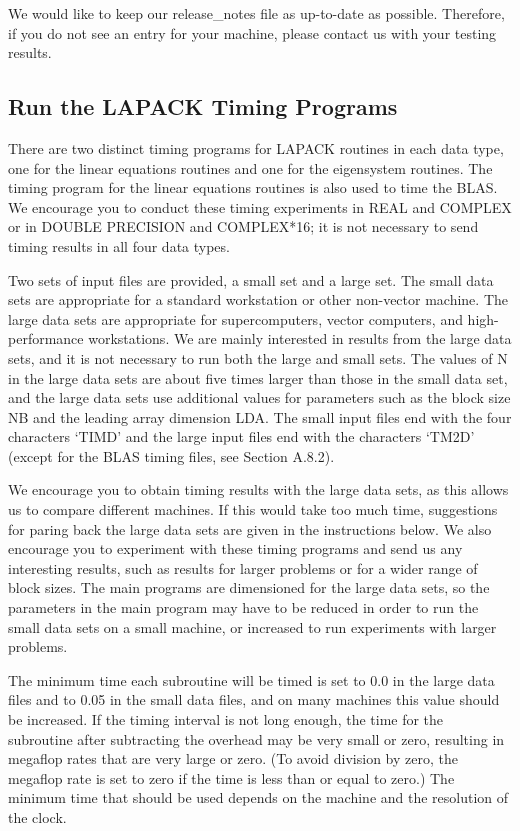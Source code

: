 We would like to keep our release\_notes file as up-to-date as possible.
Therefore, if you do not see an entry for your machine, please contact us
with your testing results.

\subsection{Run the LAPACK Timing Programs}

\dent
There are two distinct timing programs for LAPACK routines
in each data type, one for the linear equations routines and
one for the eigensystem routines.  The timing program for the
linear equations routines is also used to time the BLAS.
We encourage you to conduct these timing experiments
in REAL and COMPLEX or in DOUBLE PRECISION and COMPLEX*16; it is
not necessary to send timing results in all four data types.

Two sets of input files are provided, a small set and a large set.
The small data sets are appropriate for a standard workstation or
other non-vector machine.
The large data sets are appropriate for supercomputers, vector
computers, and high-performance workstations.
We are mainly interested in results from the large data sets, and
it is not necessary to run both the large and small sets.
The values of N in the large data sets are about five times larger
than those in the small data set,
and the large data sets use additional values for parameters such as the
block size NB and the leading array dimension LDA.
The small input files end with the four characters `TIMD' and the
large input files end with the characters `TM2D' (except for the
BLAS timing files, see Section A.8.2).

We encourage you to obtain timing results with the large data sets,
as this allows us to compare different machines.
If this would take too much time, suggestions for paring back the large
data sets are given in the instructions below.
We also encourage you to experiment with these timing
programs and send us any interesting results, such as results for
larger problems or for a wider range of block sizes.
The main programs are dimensioned for the large data sets,
so the parameters in the main program may have to be reduced in order
to run the small data sets on a small machine, or increased to run
experiments with larger problems.

The minimum time each subroutine will be timed is set to 0.0 in
the large data files and to 0.05 in the small data files, and on
many machines this value should be increased.
If the timing interval is not long
enough, the time for the subroutine after subtracting the overhead
may be very small or zero, resulting in megaflop rates that are
very large or zero. (To avoid division by zero, the megaflop rate is
set to zero if the time is less than or equal to zero.)
The minimum time that should be used depends on the machine and the
resolution of the clock.

